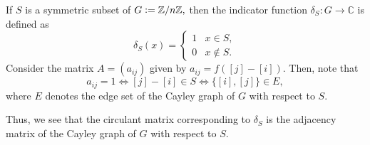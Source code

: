 \begin{ex}
    If $S$ is a symmetric subset of $G \vcentcolon= \mathbb{Z}/n\mathbb{Z},$ then the indicator function $\delta_S : G \to \mathbb{C}$ is defined as
    \begin{equation*} 
        \delta_S(x) = \begin{cases}
            1 & x \in S,\\
            0 & x \notin S. 
        \end{cases}
    \end{equation*} 
    Consider the matrix $A = (a_{ij})$ given by $a_{ij} = f([j] - [i]).$ Then, note that 
    \begin{equation*} 
        a_{ij} = 1 \iff [j] - [i] \in S \iff \{[i], [j]\} \in E,
    \end{equation*}
    where $E$ denotes the edge set of the Cayley graph of $G$ with respect to $S.$

    Thus, we see that the circulant matrix corresponding to $\delta_S$ is the adjacency matrix of the Cayley graph of $G$ with respect to $S.$
\end{ex}

